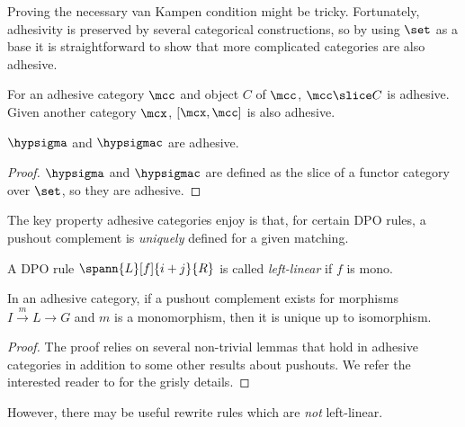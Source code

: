 Proving the necessary van Kampen condition might be tricky.
Fortunately, adhesivity is preserved by several categorical constructions, so
by using \(\set\) as a base it is straightforward to show that more complicated
categories are also adhesive.

\begin{proposition}
    For an adhesive category \(\mcc\) and object \(C\) of \(\mcc\),
    \(\mcc \slice C\) is adhesive.
    Given another category \(\mcx\), \([\mcx, \mcc]\) is also adhesive.
\end{proposition}

\begin{corollary}
    \(\hypsigma\) and \(\hypsigmac\) are adhesive.
\end{corollary}
\begin{proof}
    \(\hypsigma\) and \(\hypsigmac\) are defined as the slice of a functor
    category over \(\set\), so they are adhesive.
\end{proof}

The key property adhesive categories enjoy is that, for certain DPO rules, a
pushout complement is \emph{uniquely} defined for a given matching.

\begin{definition}
    A DPO rule \(\spann{L}[f]{i+j}{R}\) is called \emph{left-linear} if \(f\)
    is mono.
\end{definition}

\begin{theorem}
    In an adhesive category, if a pushout complement exists for morphisms
    \(I \xrightarrow{m} L \to G\) and \(m\) is a monomorphism, then it is unique
    up to isomorphism.
\end{theorem}
\begin{proof}
    The proof relies on several non-trivial lemmas that hold in adhesive
    categories in addition to some other results about pushouts.
    We refer the interested reader to
    \cite[Lems. 4.3.6 - 4.3.9]{kissinger2012pictures} for the grisly details.
\end{proof}

However, there may be useful rewrite rules which are \emph{not} left-linear.

